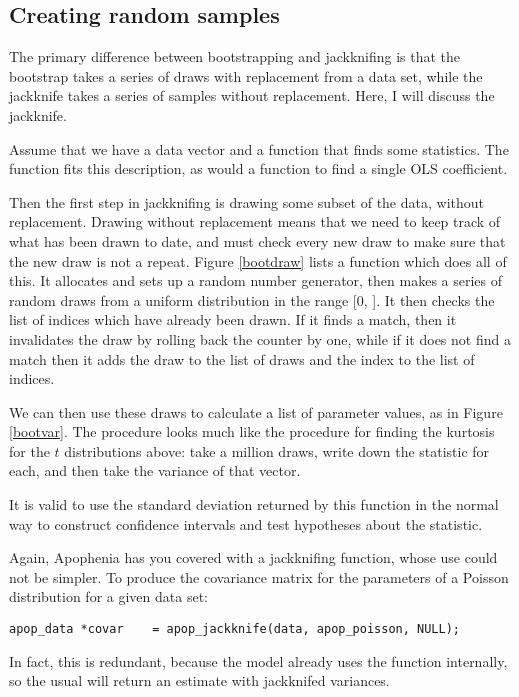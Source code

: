 \subsection{Creating random samples} 
The primary difference between bootstrapping and jackknifing is that
the bootstrap takes a series of draws with replacement from a data set,
while the jackknife takes a series of samples without replacement. Here,
I will discuss the jackknife.

Assume that we have a
data vector  and a function  that finds some statistics. The
function  fits this description, as would a function to find
a single OLS coefficient.


Then the first step in jackknifing is drawing some subset of the data,
without replacement. Drawing without replacement means that we need to
keep track of what has been drawn to date, and must check every new draw
to make sure that the new draw is not a repeat. Figure \ref{bootdraw} lists a function which
does all of this. It allocates and sets up a random number generator, then
makes a series of random draws from a uniform distribution in the range
[0, ]. It then checks the list of indices which have
already been drawn. If it finds a match, then it invalidates the draw
by rolling back the counter by one, while if it does not find a match then it
adds the draw to the list of draws and the index to the list of indices.

 We can then use these draws to calculate a
list of parameter values, as in Figure \ref{bootvar}. The procedure
looks much like the procedure for finding the kurtosis for the $t$
distributions above: take a million draws, write down the statistic for
each, and then take the variance of that vector.

It is valid to use the standard deviation returned by this function 
in the normal way to construct confidence intervals and test
hypotheses about the statistic.

Again, Apophenia has you covered with a jackknifing function, whose
use could not be simpler. To produce the covariance matrix for the
parameters of a Poisson distribution for a given data set:
\begin{lstlisting}
apop_data *covar    = apop_jackknife(data, apop_poisson, NULL);
\end{lstlisting}
In fact, this is redundant, because the 
model already uses the  function internally,
so the usual 
will return an estimate with jackknifed variances.

